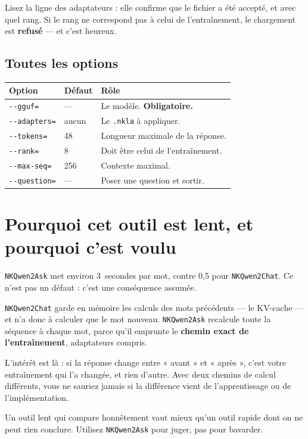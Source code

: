 Lisez la ligne des adaptateurs : elle confirme que le fichier a été accepté, et
avec quel rang. Si le rang ne correspond pas à celui de l'entraînement, le
chargement est \textbf{refusé} — et c'est heureux.

\subsection{Toutes les options}

\begin{center}
\begin{tabular}{p{3.4cm}p{1.8cm}p{8.3cm}}
\toprule
\textbf{Option} & \textbf{Défaut} & \textbf{Rôle} \\
\midrule
\texttt{-{}-gguf=} & — & Le modèle. \textbf{Obligatoire.} \\
\texttt{-{}-adapters=} & aucun & Le \texttt{.nkla} à appliquer. \\
\texttt{-{}-tokens=} & 48 & Longueur maximale de la réponse. \\
\texttt{-{}-rank=} & 8 & Doit être celui de l'entraînement. \\
\texttt{-{}-max-seq=} & 256 & Contexte maximal. \\
\texttt{-{}-question=} & — & Poser une question et sortir. \\
\bottomrule
\end{tabular}
\end{center}

\section{Pourquoi cet outil est lent, et pourquoi c'est voulu}

\texttt{NKQwen2Ask} met environ 3~secondes par mot, contre 0,5 pour
\texttt{NKQwen2Chat}. Ce n'est pas un défaut : c'est une conséquence assumée.

\texttt{NKQwen2Chat} garde en mémoire les calculs des mots précédents — le
KV-cache — et n'a donc à calculer que le mot nouveau. \texttt{NKQwen2Ask}
recalcule toute la séquence à chaque mot, parce qu'il emprunte le
\textbf{chemin exact de l'entraînement}, adaptateurs compris.

L'intérêt est là : si la réponse change entre « avant » et « après », c'est
votre entraînement qui l'a changée, et rien d'autre. Avec deux chemins de calcul
différents, vous ne sauriez jamais si la différence vient de l'apprentissage ou
de l'implémentation.

\begin{nkretenir}
Un outil lent qui compare honnêtement vaut mieux qu'un outil rapide dont on ne
peut rien conclure. Utilisez \texttt{NKQwen2Ask} pour juger, pas pour bavarder.
\end{nkretenir}

